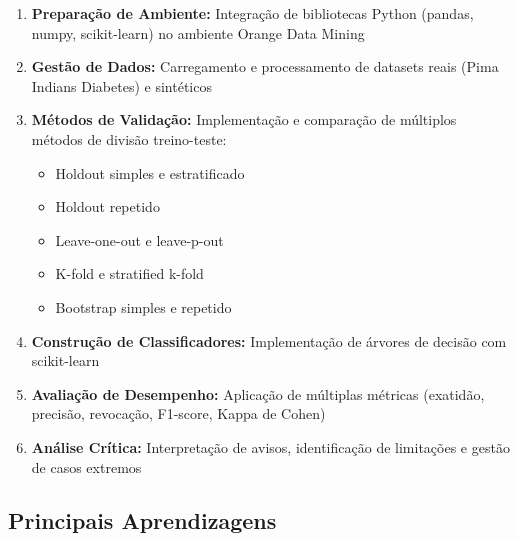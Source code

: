 \documentclass[12pt,a4paper]{article}
\begin{document}
\begin{enumerate}
    \item \textbf{Preparação de Ambiente:} Integração de bibliotecas Python (pandas, numpy, scikit-learn) no ambiente Orange Data Mining
    
    \item \textbf{Gestão de Dados:} Carregamento e processamento de datasets reais (Pima Indians Diabetes) e sintéticos
    
    \item \textbf{Métodos de Validação:} Implementação e comparação de múltiplos métodos de divisão treino-teste:
    \begin{itemize}
        \item Holdout simples e estratificado
        \item Holdout repetido
        \item Leave-one-out e leave-p-out
        \item K-fold e stratified k-fold
        \item Bootstrap simples e repetido
    \end{itemize}
    
    \item \textbf{Construção de Classificadores:} Implementação de árvores de decisão com scikit-learn
    
    \item \textbf{Avaliação de Desempenho:} Aplicação de múltiplas métricas (exatidão, precisão, revocação, F1-score, Kappa de Cohen)
    
    \item \textbf{Análise Crítica:} Interpretação de avisos, identificação de limitações e gestão de casos extremos
\end{enumerate}

\subsection{Principais Aprendizagens}
\end{document}
